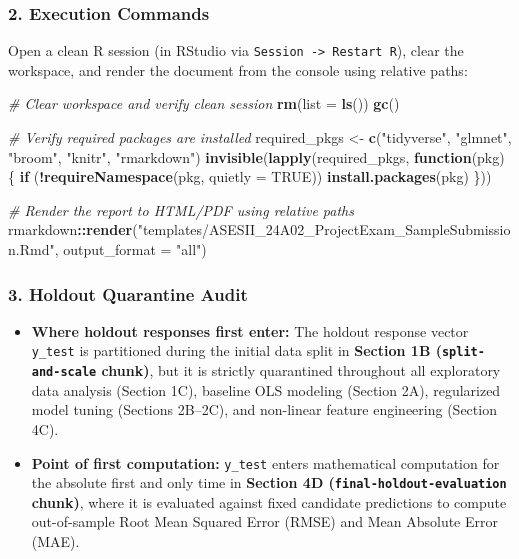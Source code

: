 \documentclass[
  11pt,
]{article}
\newenvironment{Shaded}{\begin{snugshade}}{\end{snugshade}}
\newcommand{\AttributeTok}[1]{\textcolor[rgb]{0.13,0.29,0.53}{#1}}
\newcommand{\CommentTok}[1]{\textcolor[rgb]{0.56,0.35,0.01}{\textit{#1}}}
\newcommand{\ConstantTok}[1]{\textcolor[rgb]{0.56,0.35,0.01}{#1}}
\newcommand{\ControlFlowTok}[1]{\textcolor[rgb]{0.13,0.29,0.53}{\textbf{#1}}}
\newcommand{\FunctionTok}[1]{\textcolor[rgb]{0.13,0.29,0.53}{\textbf{#1}}}
\newcommand{\NormalTok}[1]{#1}
\newcommand{\OtherTok}[1]{\textcolor[rgb]{0.56,0.35,0.01}{#1}}
\newcommand{\SpecialCharTok}[1]{\textcolor[rgb]{0.81,0.36,0.00}{\textbf{#1}}}
\newcommand{\StringTok}[1]{\textcolor[rgb]{0.31,0.60,0.02}{#1}}
\providecommand{\tightlist}{%
  \setlength{\itemsep}{0pt}\setlength{\parskip}{0pt}}
\begin{document}
\subsubsection{2. Execution Commands}\label{execution-commands}

Open a clean R session (in RStudio via
\texttt{Session\ -\textgreater{}\ Restart\ R}), clear the workspace, and
render the document from the console using relative paths:

\begin{Shaded}
\begin{Highlighting}[]
\CommentTok{\# Clear workspace and verify clean session}
\FunctionTok{rm}\NormalTok{(}\AttributeTok{list =} \FunctionTok{ls}\NormalTok{())}
\FunctionTok{gc}\NormalTok{()}

\CommentTok{\# Verify required packages are installed}
\NormalTok{required\_pkgs }\OtherTok{\textless{}{-}} \FunctionTok{c}\NormalTok{(}\StringTok{"tidyverse"}\NormalTok{, }\StringTok{"glmnet"}\NormalTok{, }\StringTok{"broom"}\NormalTok{, }\StringTok{"knitr"}\NormalTok{, }\StringTok{"rmarkdown"}\NormalTok{)}
\FunctionTok{invisible}\NormalTok{(}\FunctionTok{lapply}\NormalTok{(required\_pkgs, }\ControlFlowTok{function}\NormalTok{(pkg) \{}
  \ControlFlowTok{if}\NormalTok{ (}\SpecialCharTok{!}\FunctionTok{requireNamespace}\NormalTok{(pkg, }\AttributeTok{quietly =} \ConstantTok{TRUE}\NormalTok{)) }\FunctionTok{install.packages}\NormalTok{(pkg)}
\NormalTok{\}))}

\CommentTok{\# Render the report to HTML/PDF using relative paths}
\NormalTok{rmarkdown}\SpecialCharTok{::}\FunctionTok{render}\NormalTok{(}\StringTok{"templates/ASESII\_24A02\_ProjectExam\_SampleSubmission.Rmd"}\NormalTok{, }\AttributeTok{output\_format =} \StringTok{"all"}\NormalTok{)}
\end{Highlighting}
\end{Shaded}

\subsubsection{3. Holdout Quarantine
Audit}\label{holdout-quarantine-audit}

\begin{itemize}
\tightlist
\item
  \textbf{Where holdout responses first enter:} The holdout response
  vector \texttt{y\_test} is partitioned during the initial data split
  in \textbf{Section 1B (\texttt{split-and-scale} chunk)}, but it is
  strictly quarantined throughout all exploratory data analysis (Section
  1C), baseline OLS modeling (Section 2A), regularized model tuning
  (Sections 2B--2C), and non-linear feature engineering (Section 4C).
\item
  \textbf{Point of first computation:} \texttt{y\_test} enters
  mathematical computation for the absolute first and only time in
  \textbf{Section 4D (\texttt{final-holdout-evaluation} chunk)}, where
  it is evaluated against fixed candidate predictions to compute
  out-of-sample Root Mean Squared Error (RMSE) and Mean Absolute Error
  (MAE).
\end{itemize}
\end{document}

